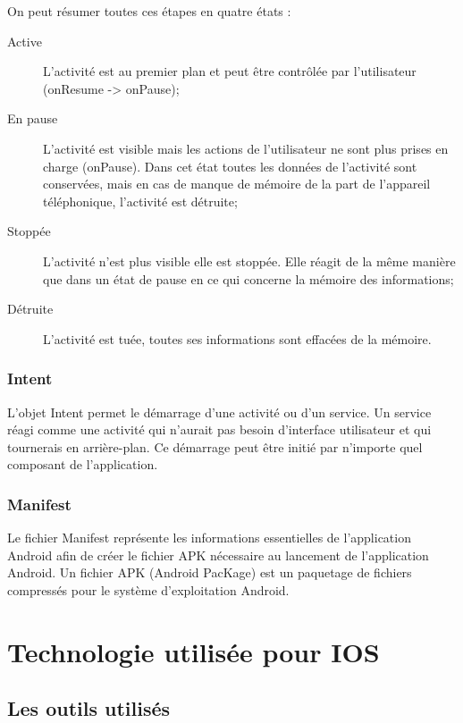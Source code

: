 On peut résumer toutes ces étapes en quatre états :
\begin{description}
	\item[Active] L'activité est au premier plan et peut être contrôlée par l'utilisateur (onResume -> onPause);
	\item[En pause] L'activité est visible mais les actions de l'utilisateur ne sont plus prises en charge (onPause). Dans cet état toutes les données de l'activité sont conservées, mais en cas de manque de mémoire de la part de l'appareil téléphonique, l'activité est détruite;
	\item[Stoppée] L'activité n'est plus visible elle est stoppée. Elle réagit de la même manière que dans un état de pause en ce qui concerne la mémoire des informations;
	\item[Détruite] L'activité est tuée, toutes ses informations sont effacées de la mémoire.
\end{description}

\subsubsection{Intent}

L'objet Intent permet le démarrage d'une activité ou d'un service. Un service réagi comme une activité qui n'aurait pas besoin d'interface utilisateur et qui tournerais en arrière-plan. Ce démarrage peut être initié par n'importe quel composant de l'application.

\subsubsection{Manifest}
Le fichier Manifest représente les informations essentielles de l'application Android afin de créer le fichier APK nécessaire au lancement de l'application Android. Un fichier APK (Android PacKage) est un paquetage de fichiers compressés pour le système d'exploitation Android.

\section{Technologie utilisée pour IOS}

\subsection{Les outils utilisés}


